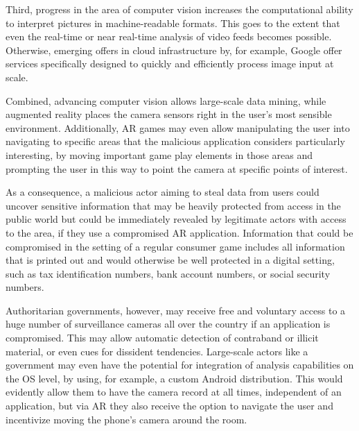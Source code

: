 Third, progress in the area of computer vision increases the computational ability to interpret pictures in machine-readable formats. This goes to the extent that even the real-time or near real-time analysis of video feeds becomes possible. Otherwise, emerging offers in cloud infrastructure by, for example, Google offer services specifically designed to quickly and efficiently process image input at scale.

Combined, advancing computer vision allows large-scale data mining, while augmented reality places the camera sensors right in the user's most sensible environment.
Additionally, AR games may even allow manipulating the user into navigating to specific areas that the malicious application considers particularly interesting, by moving important game play elements in those areas and prompting the user in this way to point the camera at specific points of interest.

As a consequence, a malicious actor aiming to steal data from users could uncover sensitive information that may be heavily protected from access in the public world but could be immediately revealed by legitimate actors with access to the area, if they use a compromised AR application.
Information that could be compromised in the setting of a regular consumer game includes all information that is printed out and would otherwise be well protected in a digital setting, such as tax identification numbers, bank account numbers, or social security numbers.

Authoritarian governments, however, may receive free and voluntary access to a huge number of surveillance cameras all over the country if an application is compromised. This may allow automatic detection of contraband or illicit material, or even cues for dissident tendencies. Large-scale actors like a government may even have the potential for integration of analysis capabilities on the OS level, by using, for example, a custom Android distribution.
This would evidently allow them to have the camera record at all times, independent of an application, but via AR they also receive the option to navigate the user and incentivize moving the phone's camera around the room.

